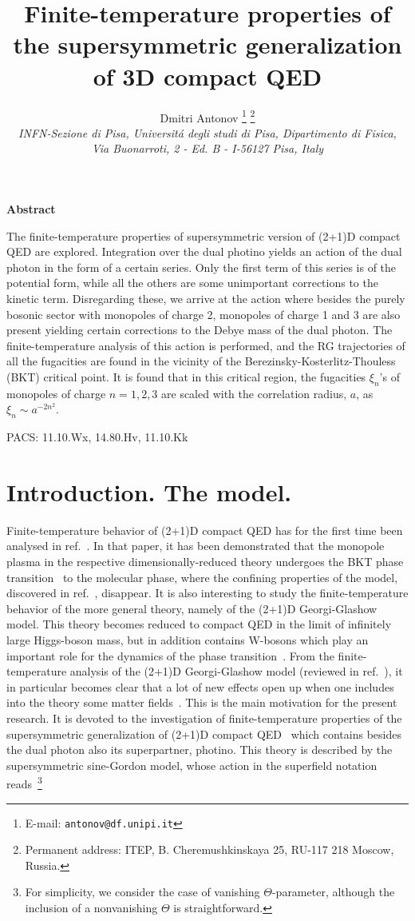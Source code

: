 \documentclass[a4paper,12pt]{article}
\title{
\vspace{-3mm}
\rightline{\small IFUP-TH 2002/41}
\vspace{8mm}
\bf Finite-temperature properties of the supersymmetric generalization of
3D compact QED}
\author{
Dmitri Antonov \thanks{
E-mail: {\tt antonov@df.unipi.it}}
\thanks{Permanent address:
ITEP, B. Cheremushkinskaya 25, RU-117 218 Moscow, Russia.}\\
{\it INFN-Sezione di Pisa, Universit\'a degli studi di Pisa,
Dipartimento di Fisica,}\\
{\it Via Buonarroti, 2 - Ed. B -
I-56127 Pisa, Italy}}
\date{}
\begin{document}

\maketitle
\vspace{1mm}
\centerline{\bf {Abstract}}
\vspace{3mm}
\noindent
The finite-temperature properties of supersymmetric version of (2+1)D compact QED are explored.
Integration over the dual photino yields an action of the dual photon in the
form of a certain series. Only the first term of this series is of the potential form,
while all the others are some unimportant corrections to the kinetic term.
Disregarding these, we arrive at the action where besides the purely bosonic sector with
monopoles of charge 2, monopoles of charge 1 and 3 are also present yielding
certain corrections to the Debye mass of the dual photon. The finite-temperature analysis
of this action is performed, and the RG trajectories of all the fugacities are found
in the vicinity of the Berezinsky-Kosterlitz-Thouless (BKT) critical point.
It is found that in this critical region, the fugacities $\xi_n$'s of monopoles of charge
$n=1,2,3$ are scaled with the correlation radius, $a$, as $\xi_n\sim a^{-2n^2}$.




\vspace{5mm}
\noindent
PACS: 11.10.Wx, 14.80.Hv, 11.10.Kk


\newpage
\section{Introduction. The model.}
Finite-temperature behavior of (2+1)D compact QED has for the first time been analysed in ref.~\cite{nk}.
In that paper, it has been demonstrated that the monopole plasma in the respective dimensionally-reduced theory
undergoes the BKT phase transition~\cite{bkt} to the molecular phase, where the confining properties of the
model, discovered in ref.~\cite{1}, disappear.
It is also interesting to study the finite-temperature behavior of the more general theory, namely of the
(2+1)D Georgi-Glashow model. This theory becomes reduced to compact QED
in the limit of infinitely large Higgs-boson mass, but in addition contains W-bosons which play an important role for the
dynamics of the phase transition~\cite{2}. From the finite-temperature analysis of the (2+1)D Georgi-Glashow model
(reviewed in ref.~\cite{revGG}), it in particular
becomes clear that a lot of new effects open up when one includes into the theory some matter fields~\cite{mat}.
This is the main motivation for the present research. It is devoted to the investigation
of finite-temperature properties of the supersymmetric generalization of (2+1)D compact QED~\cite{ahw} which
contains besides the dual photon also its superpartner, photino. This theory is described by the supersymmetric
sine-Gordon model, whose action in the superfield notation reads~\footnote{For simplicity, we consider the
case of vanishing $\Theta$-parameter, although the inclusion of a nonvanishing $\Theta$ is straightforward.}
\end{document}
